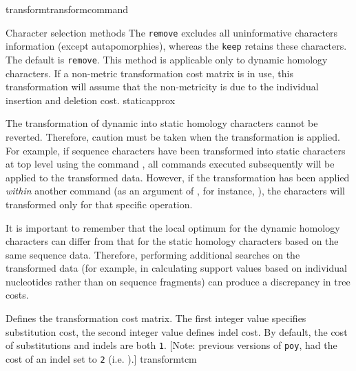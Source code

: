 \begin{command}{transform}{transformcommand}
\begin{arguments}
\begin{argumentgroup}{Character selection methods}
{                The \poylident  \texttt{remove} excludes all uninformative characters
                information (except autapomorphies), whereas the \poylident \texttt{keep}
                retains these characters. The default is \texttt{remove}. This
                method is applicable only to dynamic homology characters. If
                a non-metric transformation cost matrix is in use, this
                transformation will assume that the non-metricity is due to the
                individual insertion and deletion cost.}
                {staticapprox}

            \begin{statement}
                The transformation of dynamic into static homology characters cannot be reverted.
                Therefore, caution must be taken when the transformation is applied. For example,
                if sequence characters have been transformed into static characters at top level using
                the command , all commands executed 
                subsequently will be applied to the transformed data. However, if the transformation has 
                been applied \emph{within} another command (as an argument of , 
                for instance, ), the characters will 
                transformed only for that specific operation.
            \end{statement}
           
            \begin{statement}
                It is important to remember that the local optimum for the dynamic homology
                characters can differ from that for the static homology characters based on the
                same sequence data. Therefore, performing additional searches on the transformed
                data (for example, in calculating support values based on individual nucleotides
                rather than on sequence fragments) can produce a discrepancy in tree costs.
            \end{statement}

                {Defines the transformation cost matrix. The first integer value specifies
                substitution cost, the second integer value defines indel cost. By default,
                the cost of substitutions and indels are both \texttt{1}.  
                [Note: previous versions of \texttt{poy}, had the cost of an indel set to 
                \texttt{2} (i.e. ).]}
                {transformtcm}
                

\end{argumentgroup}
\end{arguments}
\end{command}
